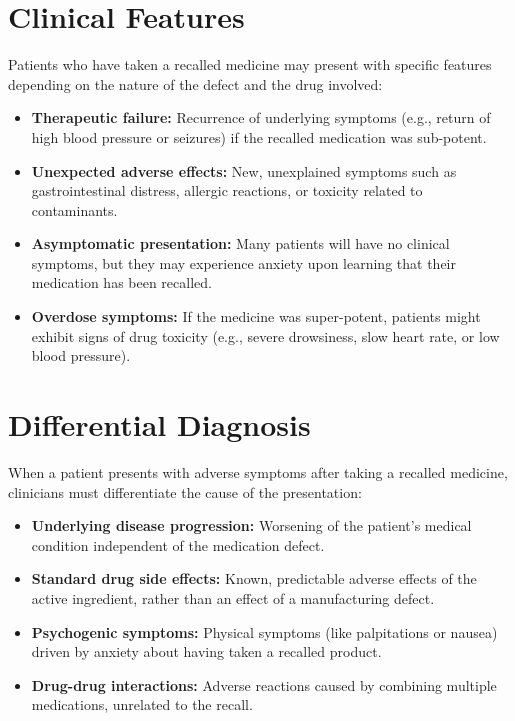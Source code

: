\section*{Clinical Features}
Patients who have taken a recalled medicine may present with specific features depending on the nature of the defect and the drug involved:

\begin{itemize}
    \item \textbf{Therapeutic failure:} Recurrence of underlying symptoms (e.g., return of high blood pressure or seizures) if the recalled medication was sub-potent.
    \item \textbf{Unexpected adverse effects:} New, unexplained symptoms such as gastrointestinal distress, allergic reactions, or toxicity related to contaminants.
    \item \textbf{Asymptomatic presentation:} Many patients will have no clinical symptoms, but they may experience anxiety upon learning that their medication has been recalled.
    \item \textbf{Overdose symptoms:} If the medicine was super-potent, patients might exhibit signs of drug toxicity (e.g., severe drowsiness, slow heart rate, or low blood pressure).
\end{itemize}

\section*{Differential Diagnosis}
When a patient presents with adverse symptoms after taking a recalled medicine, clinicians must differentiate the cause of the presentation:

\begin{itemize}
    \item \textbf{Underlying disease progression:} Worsening of the patient's medical condition independent of the medication defect.
    \item \textbf{Standard drug side effects:} Known, predictable adverse effects of the active ingredient, rather than an effect of a manufacturing defect.
    \item \textbf{Psychogenic symptoms:} Physical symptoms (like palpitations or nausea) driven by anxiety about having taken a recalled product.
    \item \textbf{Drug-drug interactions:} Adverse reactions caused by combining multiple medications, unrelated to the recall.
\end{itemize}

